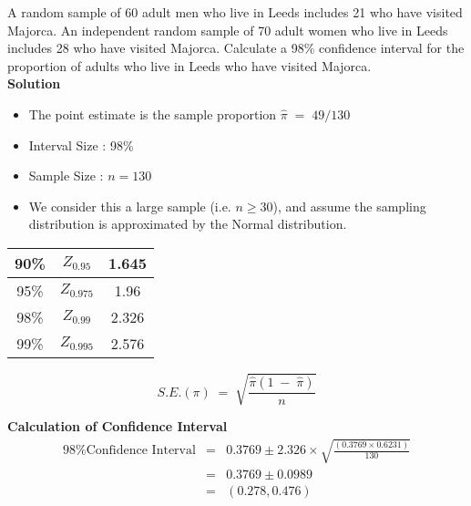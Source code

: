 \documentclass[a4paper,12pt]{article}
\begin{document}
\large
\noindent A random sample of 60 adult men who live in Leeds includes 21 who have visited Majorca. An independent random sample of 70 adult women who live in Leeds includes 28 who have visited Majorca.
Calculate a 98\% confidence interval for the proportion of adults who live in Leeds
who have visited Majorca.\\
\medskip 
\noindent \textbf{Solution}
\begin{itemize}
\item The point estimate is the sample proportion ${ \displaystyle \hat{\pi}  \;=\; 49/130  }$
\item Interval Size : 98\%
\item Sample Size : $n=130$
\item We consider this a large sample (i.e. $n \geq 30$), and assume the sampling distribution is approximated by the Normal distribution.
\end{itemize}
\begin{center}
\begin{tabular}{|c|c|c|} \hline
90\%     & $Z_{0.95}$ & 1.645 \\ \hline
95\%     & $Z_{0.975}$ & 1.96 \\ \hline
98\%    & $Z_{0.99}$ & 2.326    \\ \hline
99\%    & $Z_{0.995}$ &  2.576  \\ \hline
\end{tabular}
\end{center}


\begin{framed}
\[ S.E.( \pi) \;=\; \sqrt{ \frac{\hat{\pi} (1\;-\;\hat{\pi})  }{n}  } \]
\end{framed}
\medskip
\noindent \textbf{Calculation of Confidence Interval}\\
\begin{eqnarray*}
\mbox{98\% Confidence Interval} &=& 0.3769 \pm 2.326 \times  \sqrt{    \frac{ (0.3769 \times 0.6231)  }{130 }   }\\
&=& 0.3769 \pm 0.0989 \\
&=& (0.278, 0.476) \\
\end{eqnarray*}

\end{document}
